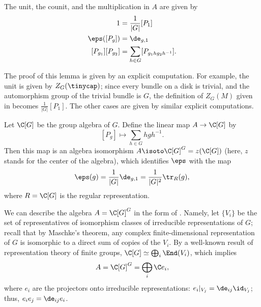 \begin{lemma}\label{l:dw-frobenius-structure}
  The unit, the counit, and the multiplication in $A$ are given by
  \begin{equation}\label{e:dw-frob-structure}
    \begin{aligned}
      1 &= \frac{1}{|G|} [P_1]\\
      \eps([P_g]) &= \de_{g,1}\\
      [P_{g_1}][P_{g_2}]&=\sum_{h\in G} [P_{g_1 hg_2h^{-1}}].
    \end{aligned}
  \end{equation}
\end{lemma}
The proof of this lemma is given by an explicit computation. For example, the
unit is given by $Z_G(\tinycap)$; since every bundle on a disk is trivial, and
the automorphism group of the trivial bundle is $G$, the definition of $Z_G(M)$
given in  becomes $\frac{1}{|G|} [P_1]$. The other cases are given
by similar explicit computations.

\begin{corollary}\label{c:dw-center}
  Let $\C[G]$ be the group algebra of $G$.
  Define the linear map $A\to \C[G]$ by
  $$
    [P_g]\mapsto \sum_{h \in G} hgh^{-1}.
  $$
  Then this map is an algebra isomorphism $A\isoto \C[G]^G=z(\C[G])$
  \textup{(}here, $z$ stands for the center of the algebra\textup{)}, which
  identifies $\eps$ with the map
  \begin{equation}\label{e:dw-eps}
    \eps(g) = \frac{1}{|G|}\de_{g, 1}= \frac{1}{|G|^2}\tr_{R}(g),
  \end{equation}
  where $R=\C[G]$ is the regular representation.
\end{corollary}

We can describe the algebra $A=\C[G]^G$ in the form of
. Namely, let $\{V_i\}$ be the set of
representatives of isomorphism classes of irreducible representations of $G$;
recall that by Maschke's theorem, any complex finite-dimensional representation
of $G$ is isomorphic to a direct sum of copies of the $V_i$. By a well-known
result of representation theory of finite groups,
$\C[G]\simeq \bigoplus_i \End(V_i)$, which implies
\begin{equation}\label{e:dw-projectors}
  A=\C[G]^G=\bigoplus_i \C e_i,
\end{equation}
where $e_i$ are the projectors onto irreducible representations:
$e_i|_{V_j}=\de_{ij}\id_{V_j}$; thus, $e_i e_j = \de_{ij}e_i$.

